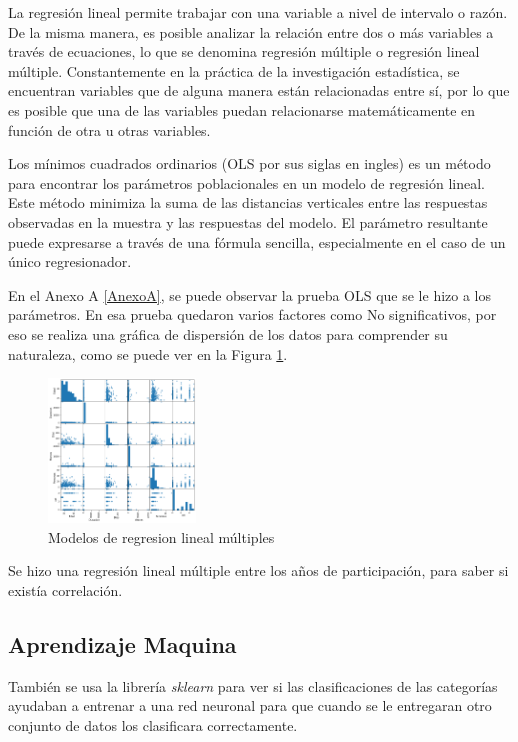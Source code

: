 \documentclass[5p,times]{elsarticle}
\begin{document}
La regresión lineal permite trabajar con una variable a nivel de intervalo o razón. De la misma manera, es posible analizar la relación entre dos o más variables a través de ecuaciones, lo que se denomina regresión múltiple o regresión lineal múltiple. Constantemente en la práctica de la investigación estadística, se encuentran variables que de alguna manera están relacionadas entre sí, por lo que es posible que una de las variables puedan relacionarse matemáticamente en función de otra u otras variables. 

Los mínimos cuadrados ordinarios (OLS por sus siglas en ingles) es un método para encontrar los parámetros poblacionales en un modelo de regresión lineal. Este método minimiza la suma de las distancias verticales entre las respuestas observadas en la muestra y las respuestas del modelo. El parámetro resultante puede expresarse a través de una fórmula sencilla, especialmente en el caso de un único regresionador. 

En el Anexo A \ref{AnexoA}, se puede observar la prueba OLS que se le hizo a los parámetros. En esa prueba quedaron varios factores como No significativos, por eso se realiza una gráfica de dispersión de los datos para comprender su naturaleza, como se puede ver en la Figura \ref{fig:MRLM}. 


\begin{figure}[H]
\centering
\includegraphics[width=0.35\textwidth]{09}
\caption{Modelos de regresion lineal múltiples}\label{fig:MRLM}
\end{figure}

Se hizo una regresión lineal múltiple entre los años de participación, para saber si existía correlación.


\subsection*{Aprendizaje Maquina}
También se usa la librería \textit{sklearn} para ver si las clasificaciones de las categorías ayudaban a entrenar a una red neuronal para que cuando se le entregaran otro conjunto de datos los clasificara correctamente.
\end{document}
